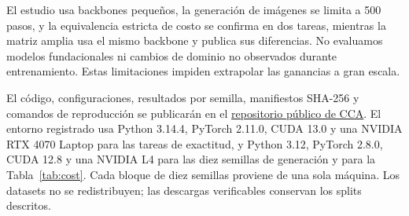 \documentclass[runningheads]{llncs}
\begin{document}
El estudio usa backbones pequeños, la generación de imágenes se limita a 500 pasos, y la equivalencia estricta de costo se confirma en dos tareas, mientras la matriz amplia usa el mismo backbone y publica sus diferencias. No evaluamos modelos fundacionales ni cambios de dominio no observados durante entrenamiento. Estas limitaciones impiden extrapolar las ganancias a gran escala.

El código, configuraciones, resultados por semilla, manifiestos SHA-256 y comandos de reproducción se publicarán en el \href{https://github.com/agustinastie2/Context-Conditioned-Rational-Activations}{repositorio público de CCA}.
El entorno registrado usa Python 3.14.4, PyTorch 2.11.0, CUDA 13.0 y una NVIDIA RTX 4070 Laptop para las tareas de exactitud, y Python 3.12, PyTorch 2.8.0, CUDA 12.8 y una NVIDIA L4 para las diez semillas de generación y para la Tabla~\ref{tab:cost}. Cada bloque de diez semillas proviene de una sola máquina. Los datasets no se redistribuyen; las descargas verificables conservan los splits descritos.



\end{document}
